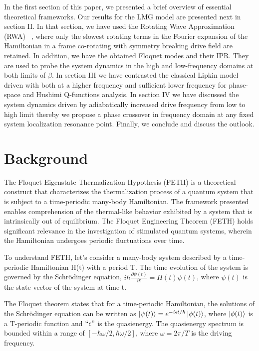 \documentclass[%
reprint,
superscriptaddress,
amsmath,amssymb,
aps,
prb,
]{revtex4-2}
\begin{document}
	In the first section of this paper, we presented a brief overview of essential theoretical frameworks. Our results for the LMG model are presented next in section II. In that section, we have used the Rotating Wave Approximation (RWA) ~\cite{fujii_introduction_2017}, where only the slowest rotating terms in the Fourier expansion of the Hamiltonian in a frame co-rotating with symmetry breaking drive field are retained. In addition, we have the obtained Floquet modes and their IPR. They are used to probe the system dynamics in the high and low-frequency domains at both limits of $\beta$. In section III we have contrasted the classical Lipkin model driven with both at a higher frequency and sufficient lower frequency for phase-space and Hushimi Q-functions analysis. In section IV we have discussed the  system dynamics driven by adiabatically increased drive frequency from low to high limit thereby we propose a phase crossover in frequency domain at any fixed system localization resonance point. Finally, we conclude and discuss the outlook. 
	
\section{\label{sec:background} Background}
	
The Floquet Eigenstate Thermalization Hypothesis (FETH) is a theoretical construct that characterizes the thermalization process of a quantum system that is subject to a time-periodic many-body Hamiltonian. The framework presented enables comprehension of the thermal-like behavior exhibited by a system that is intrinsically out of equilibrium. The Floquet Engineering Theorem (FETH) holds significant relevance in the investigation of stimulated quantum systems, wherein the Hamiltonian undergoes periodic fluctuations over time.

To understand FETH, let's consider a many-body system described by a time-periodic Hamiltonian H(t) with a period T. The time evolution of the system is governed by the Schrödinger equation, $i\hbar \frac{\partial{\psi(t)}}{\partial{t}} = H(t)\psi(t)$, where $\psi(t)$ is the state vector of the system at time t.

The Floquet theorem states that for a time-periodic Hamiltonian, the solutions of the Schrödinger equation can be written as $\ket{\psi(t)} = e^{-i\epsilon t/\hbar} \ket{\phi(t)}$, where $\ket{\phi(t)}$ is a T-periodic function and $``\epsilon"$ is the quasienergy. The quasienergy spectrum is bounded within a range of $[-\hbar\omega/2, \hbar\omega/2]$, where $\omega = 2\pi/T$ is the driving frequency.
\end{document}
